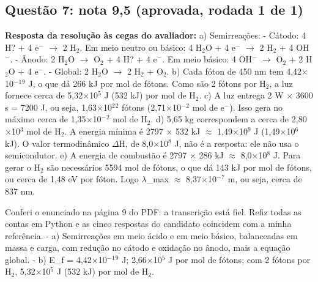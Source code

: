 \documentclass{article}%
\begin{document}
\subsection*{Questão 7: nota 9,5 (aprovada, rodada 1 de 1)}%
\textbf{Resposta da resolução às cegas do avaliador:} a) Semirreações:\newline%
{-} Cátodo: 4 H? + 4 e$^{-}$ $\to$ 2 H$_{2}$. Em meio neutro ou básico: 4 H$_{2}$O + 4 e$^{-}$ $\to$ 2 H$_{2}$ + 4 OH$^{-}$.\newline%
{-} Ânodo: 2 H$_{2}$O $\to$ O$_{2}$ + 4 H? + 4 e$^{-}$. Em meio básico: 4 OH$^{-}$ $\to$ O$_{2}$ + 2 H$_{2}$O + 4 e$^{-}$.\newline%
{-} Global: 2 H$_{2}$O $\to$ 2 H$_{2}$ + O$_{2}$.\newline%
\newline%
b) Cada fóton de 450 nm tem 4,42$\times$10$^{-}$$^{1}$$^{9}$ J, o que dá 266 kJ por mol de fótons. Como são 2 fótons por H$_{2}$, a luz fornece cerca de 5,32$\times$10$^{5}$ J (532 kJ) por mol de H$_{2}$.\newline%
\newline%
c) A luz entrega 2 W $\times$ 3600 s = 7200 J, ou seja, 1,63$\times$10$^2$$^2$ fótons (2,71$\times$10$^{-}$$^2$ mol de e$^{-}$). Isso gera no máximo cerca de 1,35$\times$10$^{-}$$^2$ mol de H$_{2}$.\newline%
\newline%
d) 5,65 kg correspondem a cerca de 2,80$\times$10$^3$ mol de H$_{2}$. A energia mínima é 2797 $\times$ 532 kJ $\approx$ 1,49$\times$10$^{9}$ J (1,49$\times$10$^{6}$ kJ). O valor termodinâmico $\Delta$H, de 8,0$\times$10$^{8}$ J, não é a resposta: ele não usa o semicondutor.\newline%
\newline%
e) A energia de combustão é 2797 $\times$ 286 kJ $\approx$ 8,0$\times$10$^{8}$ J. Para gerar o H$_{2}$ são necessários 5594 mol de fótons, o que dá 143 kJ por mol de fótons, ou cerca de 1,48 eV por fóton. Logo $\lambda$\_max $\approx$ 8,37$\times$10$^{-}$$^{7}$ m, ou seja, cerca de 837 nm.\par %
Conferi o enunciado na página 9 do PDF: a transcrição está fiel. Refiz todas as contas em Python e as cinco respostas do candidato coincidem com a minha referência.\newline%
{-} a) Semirreações em meio ácido e em meio básico, balanceadas em massa e carga, com redução no cátodo e oxidação no ânodo, mais a equação global.\newline%
{-} b) E\_f = 4,42$\times$10$^{-}$$^{1}$$^{9}$ J; 2,66$\times$10$^{5}$ J por mol de fótons; com 2 fótons por H$_{2}$, 5,32$\times$10$^{5}$ J (532 kJ) por mol de H$_{2}$.\newline%
\end{document}
